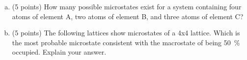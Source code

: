 \begin{enumerate}
\begin{enumerate}[a.]
            \item (5 points) How many possible microstates exist for a system containing four atoms of element A,
            two atoms of element B, and three atoms of element C?


        \pagebreak

        \item (5 points) The following lattices show microstates of a 4x4 lattice. Which is the most probable
            microstate consistent with the macrostate of being \SI{50}{\percent} occupied. Explain your answer.


        \end{enumerate}


\end{enumerate}
